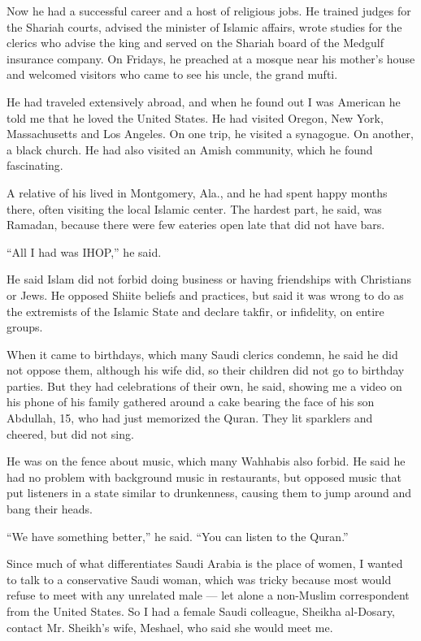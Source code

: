 Now he had a successful career and a host of religious jobs. He trained
judges for the Shariah courts, advised the minister of Islamic affairs,
wrote studies for the clerics who advise the king and served on the
Shariah board of the Medgulf insurance company. On Fridays, he preached
at a mosque near his mother's house and welcomed visitors who came to
see his uncle, the grand mufti.

He had traveled extensively abroad, and when he found out I was American
he told me that he loved the United States. He had visited Oregon, New
York, Massachusetts and Los Angeles. On one trip, he visited a
synagogue. On another, a black church. He had also visited an Amish
community, which he found fascinating.

A relative of his lived in Montgomery, Ala., and he had spent happy
months there, often visiting the local Islamic center. The hardest part,
he said, was Ramadan, because there were few eateries open late that did
not have bars.

``All I had was IHOP,'' he said.

He said Islam did not forbid doing business or having friendships with
Christians or Jews. He opposed Shiite beliefs and practices, but said it
was wrong to do as the extremists of the Islamic State and declare
takfir, or infidelity, on entire groups.

When it came to birthdays, which many Saudi clerics condemn, he said he
did not oppose them, although his wife did, so their children did not go
to birthday parties. But they had celebrations of their own, he said,
showing me a video on his phone of his family gathered around a cake
bearing the face of his son Abdullah, 15, who had just memorized the
Quran. They lit sparklers and cheered, but did not sing.

He was on the fence about music, which many Wahhabis also forbid. He
said he had no problem with background music in restaurants, but opposed
music that put listeners in a state similar to drunkenness, causing them
to jump around and bang their heads.

``We have something better,'' he said. ``You can listen to the Quran.''

Since much of what differentiates Saudi Arabia is the place of women, I
wanted to talk to a conservative Saudi woman, which was tricky because
most would refuse to meet with any unrelated male --- let alone a
non-Muslim correspondent from the United States. So I had a female Saudi
colleague, Sheikha al-Dosary, contact Mr. Sheikh's wife, Meshael, who
said she would meet me.

